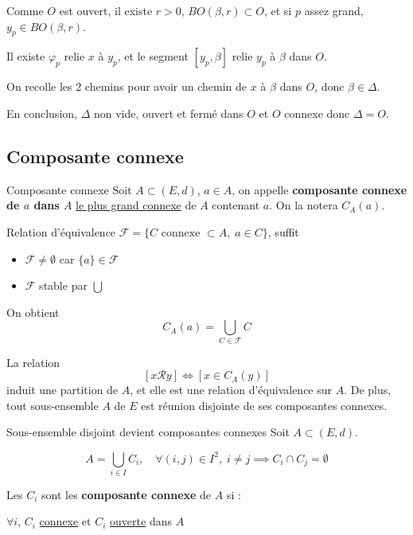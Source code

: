 \begin{myproof}{}{}
\begin{itemize}
      Comme $O$ est ouvert, il existe $r>0$, $BO(\beta, r) \subset O$, et si $p$ assez grand, $y_p \in BO(\beta,r)$. 

      Il existe $\varphi_p$ relie $x$ à $y_p$, et le segment $[y_p, \beta]$ relie $y_p$ à $\beta$ dans $O$.

      On recolle les 2 chemins pour avoir un chemin de $x$ à $\beta$ dans $O$, donc $\beta \in \Delta$. 

\end{itemize}

En conclusion, $\Delta$ non vide, ouvert et fermé dans $O$ et $O$ connexe donc $\Delta = O$. 
\end{myproof}


\subsection{Composante connexe} %
\label{sub:Composante connexe}


\begin{Definition}[colbacktitle=red!75!black]{Composante connexe}{}
Soit $A \subset (E,d)$, $a \in A$, on appelle \textbf{composante connexe de $a$ dans $A$} \underline{le plus grand connexe} de $A$ contenant $a$. On la notera $C_A(a)$.
\end{Definition}

\begin{Prop}{Relation d'équivalence}{}
$\mathcal{F} = \{ C \text{ connexe } \subset A, \; a\in C\}$, suffit
\begin{itemize}

  \item $\mathcal{F } \ne \emptyset$ car $\{a\} \in \mathcal{F}$
  \item $\mathcal{F }$ stable par $\bigcup$

\end{itemize}
On obtient 
\[
  C_A(a) = \bigcup _{C \in \mathcal{F}} C
\]

La relation 
\[
  [x \mathcal{R} y ] \iff [x \in C_A(y)]
\]
induit une partition de $A$, et elle est une relation d'équivalence sur $A$. De plus, tout sous-ensemble $A$ de $E$ est réunion disjointe de ses composantes connexes.
\end{Prop}



\begin{Prop}{Sous-ensemble disjoint devient composantes connexes}{}
Soit $A \subset (E, d)$. 

$$A = \bigcup _{i \in I} C_i, \quad \forall (i,j) \in I ^{2}, \; i \ne j \implies C_i \cap C_j = \emptyset$$

Les $C_i$ sont les \textbf{composante connexe} de $A$ si :
\begin{center}
    $\forall i$, $C_i$ \underline{connexe} et $C_i$ \underline{ouverte} dans $A$
\end{center}
\end{Prop}

